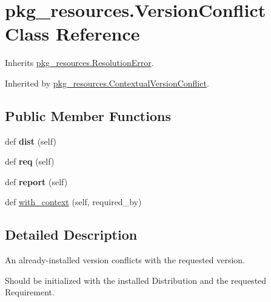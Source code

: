\hypertarget{classpkg__resources_1_1_version_conflict}{}\section{pkg\+\_\+resources.\+Version\+Conflict Class Reference}
\label{classpkg__resources_1_1_version_conflict}


Inherits \hyperlink{classpkg__resources_1_1_resolution_error}{pkg\+\_\+resources.\+Resolution\+Error}.



Inherited by \hyperlink{classpkg__resources_1_1_contextual_version_conflict}{pkg\+\_\+resources.\+Contextual\+Version\+Conflict}.

\subsection*{Public Member Functions}
\begin{DoxyCompactItemize}
\item 
\mbox{\label{classpkg__resources_1_1_version_conflict_aa9fbb5b0a8a3eca7fd7b68590df60925}} 
def {\bfseries dist} (self)
\item 
\mbox{\label{classpkg__resources_1_1_version_conflict_aa58b2603058699b5edf24f1e207bfd21}} 
def {\bfseries req} (self)
\item 
\mbox{\label{classpkg__resources_1_1_version_conflict_ad51962e2f25f4ac8eb21238f202e8291}} 
def {\bfseries report} (self)
\item 
def \hyperlink{classpkg__resources_1_1_version_conflict_a72f5accef580cb14e1f08211a22e114f}{with\+\_\+context} (self, required\+\_\+by)
\end{DoxyCompactItemize}


\subsection{Detailed Description}
\begin{DoxyVerb}An already-installed version conflicts with the requested version.

Should be initialized with the installed Distribution and the requested
Requirement.
\end{DoxyVerb}
 

